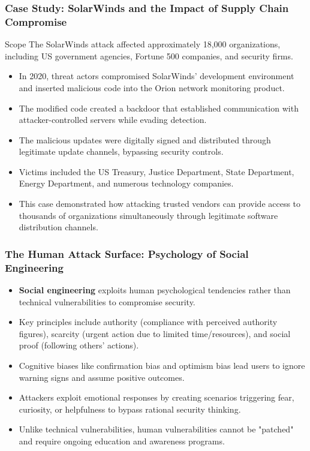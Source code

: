 \documentclass{beamer}
\begin{document}
\begin{frame}
    \frametitle{Case Study: SolarWinds and the Impact of Supply Chain Compromise}
    
    \begin{block}{Scope}
        The SolarWinds attack affected approximately 18,000 organizations, including US government agencies, Fortune 500 companies, and security firms.
    \end{block}
    
    \begin{itemize}
        \item In 2020, threat actors compromised SolarWinds' development environment and inserted malicious code into the Orion network monitoring product.
        \item The modified code created a backdoor that established communication with attacker-controlled servers while evading detection.
        \item The malicious updates were digitally signed and distributed through legitimate update channels, bypassing security controls.
        \item Victims included the US Treasury, Justice Department, State Department, Energy Department, and numerous technology companies.
        \item This case demonstrated how attacking trusted vendors can provide access to thousands of organizations simultaneously through legitimate software distribution channels.
    \end{itemize}
\end{frame}

\begin{frame}
    \frametitle{The Human Attack Surface: Psychology of Social Engineering}
    
    \begin{itemize}
        \item \textbf{Social engineering} exploits human psychological tendencies rather than technical vulnerabilities to compromise security.
        \item Key principles include authority (compliance with perceived authority figures), scarcity (urgent action due to limited time/resources), and social proof (following others' actions).
        \item Cognitive biases like confirmation bias and optimism bias lead users to ignore warning signs and assume positive outcomes.
        \item Attackers exploit emotional responses by creating scenarios triggering fear, curiosity, or helpfulness to bypass rational security thinking.
        \item Unlike technical vulnerabilities, human vulnerabilities cannot be "patched" and require ongoing education and awareness programs.
    \end{itemize}
\end{frame}
\end{document}
